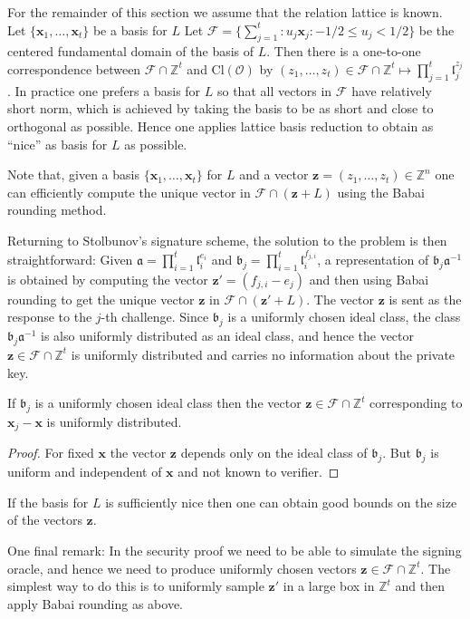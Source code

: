 \documentclass{llncs}
\newcommand{\FF}{\mathcal{F}}
\newcommand{\OO}{\mathcal{O}}
\newcommand{\Z}{\mathbb{Z}}
\newcommand{\Cl}{\text{Cl}}
\renewcommand{\a}{\mathfrak{a}}
\renewcommand{\b}{\mathfrak{b}}
\renewcommand{\l}{\mathfrak{l}}
\newcommand{\e}{\textbf{x}}
\newcommand{\f}{\textbf{x}}
\newcommand{\x}{\textbf{x}}
\newcommand{\z}{\textbf{z}}
\begin{document}
For the remainder of this section we assume that the relation lattice is known.
Let $\{ \x_1, \dots, \x_t \}$ be a basis for $L$
Let $\FF = \{ \sum_{j=1}^t : u_j \x_j : -1/2 \le u_j < 1/2 \}$ be the centered fundamental domain of the basis of $L$.
Then there is a one-to-one correspondence between $\FF \cap \Z^t$ and $\Cl(\OO)$ by
$(z_1, \dots, z_t ) \in \FF \cap \Z^t  \mapsto \prod_{j=1}^t \l_j^{z_j}$.
In practice one prefers a basis for $L$ so that all vectors in $\FF$ have relatively short norm, which is achieved by taking the basis to be as short and close to orthogonal as possible. Hence one applies lattice basis reduction to obtain as ``nice'' as basis for $L$ as possible.

Note that, given a basis $\{ \x_1, \dots, \x_t \}$ for $L$ and a vector $\z = (z_1, \dots, z_t ) \in \Z^n$ one can efficiently compute the unique vector in $\FF \cap (\z + L )$ using the Babai rounding method.



Returning to Stolbunov's signature scheme, the solution to the problem is then straightforward:
Given $\a = \prod_{i=1}^t \l_i^{e_i}$ and $\b_j = \prod_{i=1}^t \l_i^{f_{j,i}}$,
a representation of $\b_j \a^{-1}$ is obtained by computing the vector $\z' = (f_{j,i} - e_j)$
and then using Babai rounding to get the unique vector $\z$ in $\FF \cap (\z' + L )$.
The vector $\z$ is sent as the response to the $j$-th challenge.
Since $\b_j$ is a uniformly chosen ideal class, the class $\b_j \a^{-1}$ is also uniformly distributed as an ideal class, and hence the vector $\z \in \FF \cap \Z^t$ is uniformly distributed and carries no information about the private key.

\begin{lemma}
If $\b_j$ is a uniformly chosen ideal class then the vector 
$\z \in \FF \cap \Z^t$ corresponding to $\f_j - \e$ is uniformly distributed.
\end{lemma}

\begin{proof}
For fixed $\e$ the vector $\z$ depends only on the ideal class of $\b_j$.
But $\b_j$ is uniform and independent of $\e$ and not known to verifier.
\end{proof}



If the basis for $L$ is sufficiently nice then one can obtain good bounds on the size of the vectors $\z$.

One final remark: In the security proof we need to be able to simulate the signing oracle, and hence we need to produce uniformly chosen vectors $\z \in \FF \cap \Z^t$.
The simplest way to do this is to uniformly sample $\z'$ in a large box in $\Z^t$ and then apply Babai rounding as above.
\end{document}
